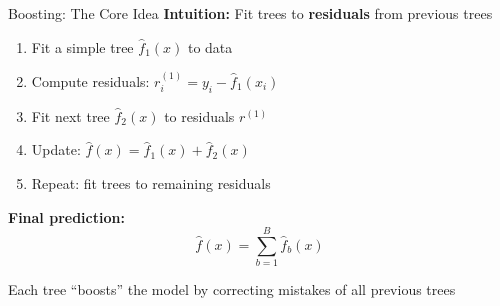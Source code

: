 \documentclass[10pt]{beamer}
\newcommand{\highlight}[1]{\textcolor{AccentOrange}{\textbf{#1}}}
\begin{document}
\begin{frame}{Boosting: The Core Idea}
  \textbf{Intuition:} Fit trees to \highlight{residuals} from previous trees

  \vspace{0.5em}
  \begin{enumerate}
    \item Fit a simple tree $\widehat{f}_1(x)$ to data
    \item Compute residuals: $r_i^{(1)} = y_i - \widehat{f}_1(x_i)$
    \item Fit next tree $\widehat{f}_2(x)$ to residuals $r^{(1)}$
    \item Update: $\widehat{f}(x) = \widehat{f}_1(x) + \widehat{f}_2(x)$
    \item Repeat: fit trees to remaining residuals
  \end{enumerate}

  \vspace{0.5em}
  \textbf{Final prediction:}
  \[
  \widehat{f}(x) = \sum_{b=1}^{B} \widehat{f}_b(x)
  \]

  \vspace{0.5em}
  Each tree ``boosts'' the model by correcting mistakes of all previous trees
\end{frame}

\end{document}

